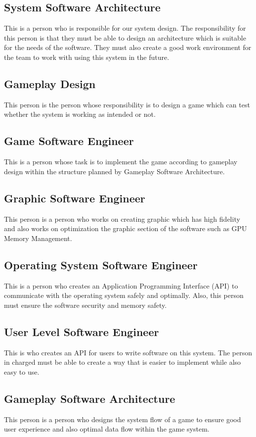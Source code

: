 \subsection*{System Software Architecture}
This is a person who is responsible for our system design.
The responsibility for this person is that they must be able to design an architecture which is
suitable for the needs of the software.
They must also create a good work environment for the team to work
with using this system in the future.

\subsection*{Gameplay Design}
This person is the person whose responsibility is to design a game which can test whether
the system is working as intended or not.

\subsection*{Game Software Engineer}
This is a person whose task is to implement the game according to gameplay design within the
structure planned by Gameplay Software Architecture.

\subsection*{Graphic Software Engineer}
This person is a person who works on creating graphic which has high fidelity and also works
on optimization the graphic section of the software such as GPU Memory Management.

\subsection*{Operating System Software Engineer}
This is a person who creates an Application Programming Interface (API) to communicate with
the operating system safely and optimally.
Also, this person must ensure the software security and memory safety.

\subsection*{User Level Software Engineer}
This is who creates an API for users to write software on this system.
The person in charged must be able to create a way that is easier to implement while
also easy to use.

\subsection*{Gameplay Software Architecture}
This person is a person who designs the system flow of a game to ensure good user experience
and also optimal data flow within the game system.

